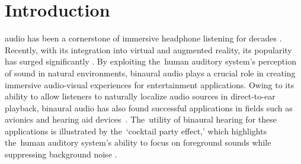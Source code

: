 
\section{Introduction}


%
%
%
%


 audio has been a cornerstone of immersive headphone listening for decades \cite{paul_binaural_2009}. Recently, with its integration into virtual and augmented reality, its popularity has surged significantly \cite{siegfried_binaural_2003}. By exploiting the~human auditory system's perception of sound in natural environments, binaural audio plays a crucial role in creating immersive audio-visual experiences for entertainment applications. Owing to its ability to allow listeners to naturally localize audio sources in direct-to-ear playback, binaural audio has also found successful applications in fields such as avionics \cite{begault_techniques_1992} and hearing aid devices~\cite{thiemann_speech_2016}. The~utility of binaural hearing for these applications is illustrated by the~`cocktail party effect,' which highlights the~human auditory system's ability to focus on foreground sounds while suppressing background noise \cite{cherry_experiments_1953}.


